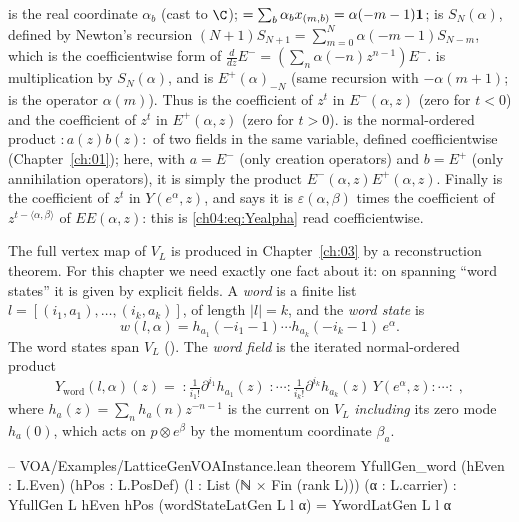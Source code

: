 \begin{dictionary}
 is the real coordinate $\alpha_b$ (cast to $\C$);
 $=\sum_b\alpha_b x_{(m,b)}=\alpha(-m-1)\mathbf{1}$;  is $S_N(\alpha)$,
defined by Newton's recursion $(N+1)S_{N+1}=\sum_{m=0}^{N}\alpha(-m-1)S_{N-m}$, which is the
coefficientwise form of $\tfrac{d}{dz}E^-=(\sum_n\alpha(-n)z^{n-1})E^-$.  is
multiplication by $S_N(\alpha)$, and  is $E^+(\alpha)_{-N}$ (same recursion with
$-\alpha(m+1)$;  is the operator $\alpha(m)$). Thus
 is the coefficient of $z^t$ in $E^-(\alpha,z)$ (zero for $t<0$) and
 the coefficient of $z^t$ in $E^+(\alpha,z)$ (zero for $t>0$).
 is the normal-ordered product $:\!a(z)b(z)\!:$ of two fields in the same variable,
defined coefficientwise (Chapter~\ref{ch:01}); here, with $a=E^-$ (only creation operators) and
$b=E^+$ (only annihilation operators), it is simply the product $E^-(\alpha,z)E^+(\alpha,z)$.
Finally  is the coefficient of $z^t$ in $Y(e^\alpha,z)$, and 
says it is $\varepsilon(\alpha,\beta)$ times the coefficient of $z^{t-\langle\alpha,\beta\rangle}$ of
$EE(\alpha,z)$: this is \eqref{ch04:eq:Yealpha} read coefficientwise.
\end{dictionary}

The full vertex map  of $V_L$ is produced in Chapter~\ref{ch:03} by a
reconstruction theorem. For this chapter we need exactly one fact about it: on spanning ``word
states'' it is given by explicit fields. A \emph{word} is a finite list
$l=[(i_1,a_1),\dots,(i_k,a_k)]$, of length $|l|=k$, and the \emph{word state} is
\begin{equation*}
  w(l,\alpha)=h_{a_1}(-i_1-1)\cdots h_{a_k}(-i_k-1)\,e^\alpha .
\end{equation*}
The word states span $V_L$ (). The \emph{word field} is the iterated
normal-ordered product
\begin{equation*}
  Y_{\mathrm{word}}(l,\alpha)(z)
  =\;:\!\tfrac{1}{i_1!}\partial^{i_1}h_{a_1}(z)\;:\!\cdots
  :\!\tfrac{1}{i_k!}\partial^{i_k}h_{a_k}(z)\,Y(e^\alpha,z)\!:\cdots\!:\;,
\end{equation*}
where $h_a(z)=\sum_n h_a(n)z^{-n-1}$ is the current on $V_L$ \emph{including} its zero mode
$h_a(0)$, which acts on $p\otimes e^\beta$ by the momentum coordinate $\beta_a$.

\begin{leancode}
-- VOA/Examples/LatticeGenVOAInstance.lean
theorem YfullGen_word (hEven : L.Even) (hPos : L.PosDef) (l : List (ℕ × Fin (rank L)))
    (α : L.carrier) :
    YfullGen L hEven hPos (wordStateLatGen L l α) = YwordLatGen L l α
\end{leancode}

